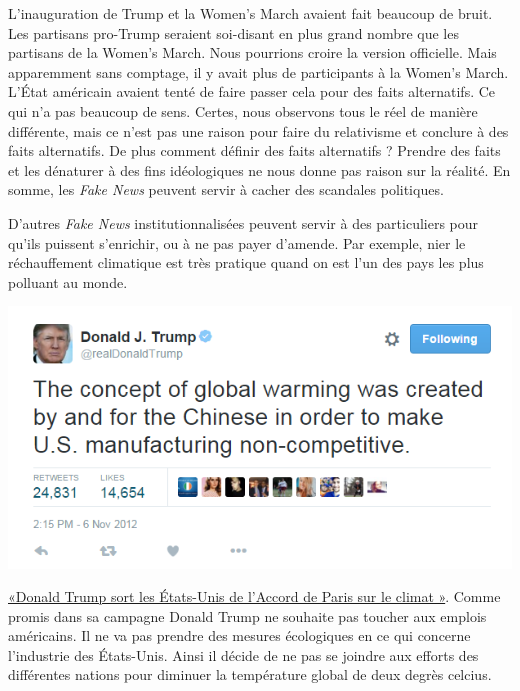 \documentclass[11pt,a4paper,oldfontcommands]{memoir}
\begin{document}
L'inauguration de Trump et la Women's March avaient fait beaucoup de bruit.
Les partisans pro-Trump seraient soi-disant en plus grand nombre que les partisans de la Women's March.
Nous pourrions croire la version officielle.
Mais apparemment sans comptage, il y avait plus de participants à la Women's March.
L'État américain avaient tenté de faire passer cela pour des faits alternatifs.
Ce qui n'a pas beaucoup de sens.
Certes, nous observons tous le réel de manière différente, mais ce n'est pas une raison pour faire du relativisme et conclure à des faits alternatifs.
De plus comment définir des faits alternatifs ?
Prendre des faits et les dénaturer à des fins idéologiques ne nous donne pas raison sur la réalité.
En somme, les \textit{Fake News} peuvent servir à cacher des scandales politiques.

D'autres \textit{Fake News} institutionnalisées peuvent servir à des particuliers pour qu'ils puissent s'enrichir, ou à ne pas payer d'amende.
Par exemple, nier le réchauffement climatique est très pratique quand on est l'un des pays les plus polluant au monde.

\begin{center}
 \includegraphics[scale=0.50]{../../img/globalwarming.png}
 \label{globalwarming_trump}
\end{center}

\href{https://www.lexpress.fr/actualite/monde/amerique-nord/donald-trump-sort-les-etats-unis-de-l-accord-de-paris-sur-le-climat_1914113.html}{«Donald Trump sort les États-Unis de l'Accord de Paris sur le climat »}.
Comme promis dans sa campagne Donald Trump ne souhaite pas toucher aux emplois américains.
Il ne va pas prendre des mesures écologiques en ce qui concerne l'industrie des États-Unis.
Ainsi il décide de ne pas se joindre aux efforts des différentes nations pour diminuer la température global de deux degrès celcius.
\end{document}
